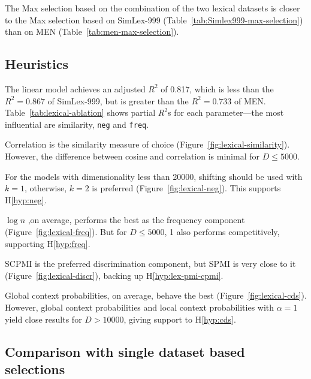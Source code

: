 The Max selection based on the combination of the two lexical datasets is closer to the Max selection based on SimLex-999 (Table~\ref{tab:Simlex999-max-selection}) than on MEN (Table~\ref{tab:men-max-selection}).



\subsection{Heuristics}

The linear model achieves an adjusted $R^2$ of 0.817, which is less than the $R^2 = 0.867$ of SimLex-999, but is greater than the $R^2 = 0.733$ of MEN. Table~\ref{tab:lexical-ablation} shows partial $R^2$s for each parameter---the most influential are similarity, \texttt{neg} and \texttt{freq}.


Correlation is the similarity measure of choice (Figure~\ref{fig:lexical-similarity}). However, the difference between cosine and correlation is minimal for $D \leq 5000$.



For the models with dimensionality less than 20000, shifting should be used with $k = 1$, otherwise, $k = 2$ is preferred (Figure~\ref{fig:lexical-neg}). This supports H\ref{hyp:neg}.


$\log n$ ,on average, performs the best as the frequency component (Figure~\ref{fig:lexical-freq}). But for $D \leq 5000$, 1 also performs competitively, supporting H\ref{hyp:freq}.
%
%
%

SCPMI is the preferred discrimination component, but SPMI is very close to it (Figure~\ref{fig:lexical-discr}), backing up H\ref{hyp:lex-pmi-cpmi}.


Global context probabilities, on average, behave the best (Figure~\ref{fig:lexical-cds}). However, global context probabilities and local context probabilities with $\alpha = 1$ yield close results for $D > 10000$, giving support to H\ref{hyp:cds}.

\subsection{Comparison with single dataset based selections}

